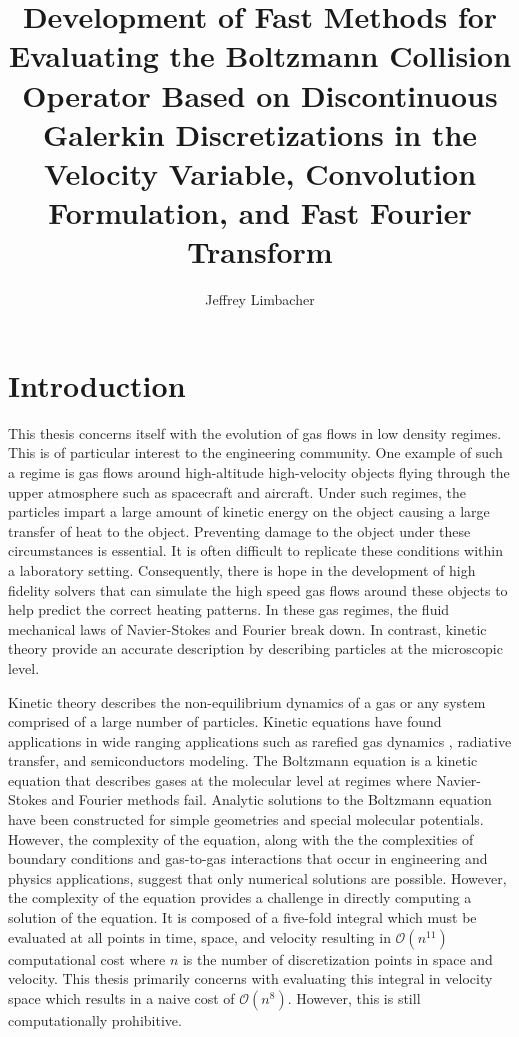 \documentclass[12pt]{CSUNthesis}
\author{Jeffrey Limbacher}
\title{Development of Fast Methods for Evaluating the Boltzmann Collision Operator Based on Discontinuous Galerkin Discretizations in the Velocity Variable, Convolution Formulation, and Fast Fourier Transform}
\begin{document}
\doublespacing


\chapter{Introduction}
\label{Chap1}
This thesis concerns itself with the evolution of gas flows in low density regimes. This is of particular interest to the engineering community. One example of such a regime is gas flows around high-altitude high-velocity objects flying through the upper atmosphere such as spacecraft and aircraft. Under such regimes, the particles impart a large amount of kinetic energy on the object causing a large transfer of heat to the object. Preventing damage to the object under these circumstances is essential. It is often difficult to replicate these conditions within a laboratory setting. Consequently,  there is hope in the development of high fidelity solvers that can simulate the high speed gas flows around these objects to help predict the correct heating patterns. In these gas regimes, the fluid mechanical laws of Navier-Stokes and Fourier break down. In contrast, kinetic theory provide an accurate description by describing particles at the microscopic level.

Kinetic theory describes the non-equilibrium dynamics of a gas or any system comprised of a large number of particles. Kinetic equations have found applications in wide ranging applications such as rarefied gas dynamics \cite{Kremer2010} \cite{Kogan1969}, radiative transfer, and semiconductors modeling. 
The Boltzmann equation is a kinetic equation that describes gases at the molecular level at regimes where Navier-Stokes and Fourier methods fail. 
Analytic solutions to the Boltzmann equation have been constructed for simple geometries and special molecular potentials. However, the complexity of the equation, along with the the complexities of boundary conditions and gas-to-gas interactions that occur in engineering and physics applications, suggest that only numerical solutions are possible. 
However, the complexity of the equation provides a challenge in directly computing a solution of the equation. 
It is composed of a five-fold integral which must be evaluated at all points in time, space, and velocity resulting in $\mathcal{O}(n^{11})$ computational cost where $n$ is the number of discretization points in space and velocity. This thesis primarily concerns with evaluating this integral in velocity space which results in a naive cost of $\mathcal{O}(n^8)$. However, this is still computationally prohibitive.
\end{document}
